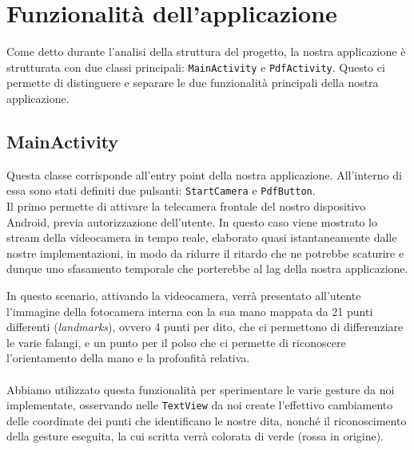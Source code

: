 \chapter{Funzionalità dell'applicazione}

Come detto durante l'analisi della struttura del progetto, la nostra applicazione è strutturata con due classi principali: \texttt{MainActivity} e \texttt{PdfActivity}. Questo ci permette di distinguere e separare le due funzionalità principali della nostra applicazione.

\begin{figure}[H]
    \centering
\end{figure}


\section{MainActivity}
Questa classe corrisponde all'entry point della nostra applicazione. All'interno di essa sono stati definiti due pulsanti: \texttt{StartCamera} e \texttt{PdfButton}.\\
Il primo permette di attivare la telecamera frontale 
del nostro dispositivo Android, previa autorizzazione dell'utente. In questo caso viene mostrato lo 
stream della videocamera in tempo reale, elaborato quasi istantaneamente dalle nostre 
implementazioni, in modo da ridurre il ritardo che ne potrebbe scaturire e dunque uno sfasamento 
temporale che porterebbe al lag della nostra applicazione.
\begin{figure}[H]
    \centering
\end{figure}

\noindent In questo scenario, attivando la videocamera, verrà presentato all'utente l'immagine della fotocamera interna con la sua mano mappata da 21 punti 
differenti (\textit{landmarks}), ovvero 4 punti per dito, che ci permettono di differenziare le varie falangi, e un punto per 
il polso che ci permette di riconoscere l'orientamento della mano e la profonfità relativa.\\
\\
\noindent Abbiamo utilizzato questa funzionalità per sperimentare le varie gesture da noi implementate, osservando nelle \texttt{TextView} da noi create
l'effettivo cambiamento delle coordinate dei punti che identificano le nostre dita, nonché il 
riconoscimento della gesture eseguita, la cui scritta verrà colorata di verde (rossa in origine).


